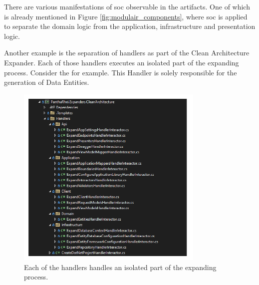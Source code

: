 There are various manifestations of \gls{soc} observable in the artifacts. One of which is
already mentioned in Figure \ref{fig:modulair_components}, where \gls{soc} is applied to
separate the domain logic from the application, infrastructure and presentation logic.

Another example is the separation of handlers as part of the Clean Architecture Expander.
Each of those handlers executes an isolated part of the expanding process. Consider the
\parencite{koks_expandentitieshandlerinteractor_2023} for example. This Handler is solely
responsible for the generation of Data Entities. 

\begin{figure}[H]
    \centering
    \includegraphics[width=0.8\textwidth]{Figures/expander_handlers.pdf}
    \caption[handlers]{Each of the handlers handles an isolated part of the expanding process.}
    \label{fig:handlers}
\end{figure}